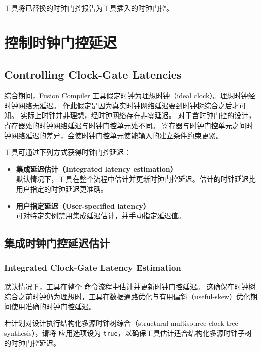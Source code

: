 工具将已替换的时钟门控报告为工具插入的时钟门控。

\section{控制时钟门控延迟}
\subsection*{Controlling Clock-Gate Latencies}

综合期间，Fusion Compiler 工具假定时钟为理想时钟（ideal clock）。理想时钟经时钟网络无延迟。
作此假定是因为真实时钟网络延迟要到时钟树综合之后才可知。
实际上时钟并非理想，经时钟网络存在非零延迟。
对于含时钟门控的设计，寄存器处的时钟网络延迟与时钟门控单元处不同。
寄存器与时钟门控单元之间时钟网络延迟的差异，会使时钟门控单元使能输入的建立条件约束更紧。

工具可通过下列方式获得时钟门控延迟：
\begin{itemize}
  \item \textbf{集成延迟估计（Integrated latency estimation）}\\
    默认情况下，工具在整个流程中估计并更新时钟门控延迟。估计的时钟延迟比用户指定的时钟延迟更准确。
  \item \textbf{用户指定延迟（User-specified latency）}\\
    可对特定实例禁用集成延迟估计，并手动指定延迟值。
\end{itemize}

\subsection{集成时钟门控延迟估计}
\subsubsection*{Integrated Clock-Gate Latency Estimation}

默认情况下，工具在整个  命令流程中估计并更新时钟门控延迟。
这确保在时钟树综合之前时钟仍为理想时，工具在数据通路优化与有用偏斜（useful-skew）优化期间使用准确的时钟门控延迟。

若计划对设计执行结构化多源时钟树综合（structural multisource clock tree synthesis），请将  应用选项设为 \texttt{true}，以确保工具估计适合结构化多源时钟子树的时钟门控延迟。

